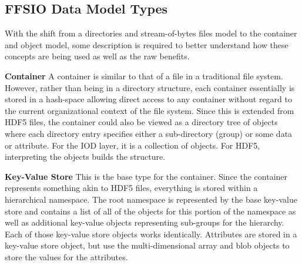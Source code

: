 \documentclass[conference]{IEEEtran} \pdfpagewidth=8.5in
\begin{document}

\subsection{FFSIO Data Model Types}
\label{sec:data-model}

With the shift from a directories and stream-of-bytes files model to the
container and object model, some description is required to better understand
how these concepts are being used as well as the raw benefits.

\textbf{Container}
A container is similar to that of a file in a traditional file system. However,
rather than being in a directory structure, each container essentially is
stored in a hash-space allowing direct access to
any container without regard to the current organizational context of the
file system.
%
Since this is extended from HDF5 files, the container could also be
viewed as a directory tree of objects where each directory entry specifies
either a sub-directory (group) or some data or attribute. For the IOD layer, it
is a collection of objects. For HDF5, interpreting the objects builds the
structure.

\textbf{Key-Value Store}
This is the base type for the container. Since the container represents
something akin to HDF5 files, everything is stored within a hierarchical
namespace. The root namespace is represented by the base key-value store and
contains a list of all of the objects for this portion of the namespace as well
as additional key-value objects representing sub-groups for the hierarchy. Each
of those key-value store objects works identically.  Attributes are stored in a
key-value store object, but use the
multi-dimensional array and blob objects to store the values for the
attributes.
\end{document}
